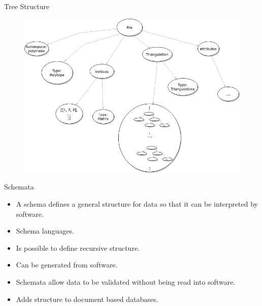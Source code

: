 \documentclass[9pt]{beamer}
\theoremstyle{definition}
\begin{document}

\begin{frame}[fragile]{Tree Structure}
  \begin{figure}
    \includegraphics[width=.9\textwidth, height=0.86\textheight]{images/tree-diagram}
  \end{figure}
\end{frame}



\begin{frame}[fragile]{Schemata}
  \begin{itemize}
  \item A schema defines a general structure for data so that it can be interpreted by software. \pause
  \item Schema languages. \pause
  \item Is possible to define recursive structure. \pause
  \item Can be generated from software. \pause
  \item Schemata allow data to be validated without being read into software. \pause
  \item Adds structure to document based databases.
  \end{itemize}
\end{frame}
\end{document}

